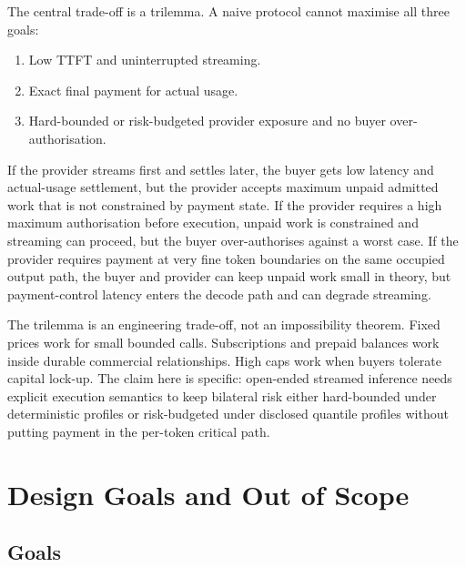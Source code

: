 \documentclass[11pt]{article}
\newcommand{\field}[1]{\texttt{\detokenize{#1}}}
\begin{document}
The central trade-off is a trilemma. A naive protocol cannot maximise all three goals:

\begin{enumerate}
  \item Low TTFT and uninterrupted streaming.
  \item Exact final payment for actual usage.
  \item Hard-bounded or risk-budgeted provider exposure and no buyer over-authorisation.
\end{enumerate}

If the provider streams first and settles later, the buyer gets low latency and actual-usage settlement, but the provider accepts maximum unpaid admitted work that is not constrained by payment state. If the provider requires a high maximum authorisation before execution, unpaid work is constrained and streaming can proceed, but the buyer over-authorises against a worst case. If the provider requires payment at very fine token boundaries on the same occupied output path, the buyer and provider can keep unpaid work small in theory, but payment-control latency enters the decode path and can degrade streaming.

The trilemma is an engineering trade-off, not an impossibility theorem. Fixed prices work for small bounded calls. Subscriptions and prepaid balances work inside durable commercial relationships. High \field{upto} caps work when buyers tolerate capital lock-up. The claim here is specific: open-ended streamed inference needs explicit execution semantics to keep bilateral risk either hard-bounded under deterministic profiles or risk-budgeted under disclosed quantile profiles without putting payment in the per-token critical path.

\section{Design Goals and Out of Scope}

\subsection{Goals}
\end{document}
